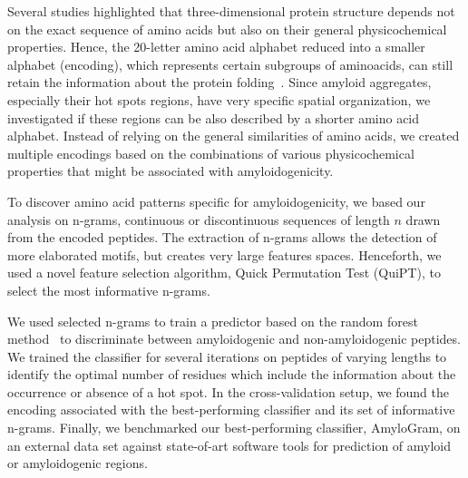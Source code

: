 \documentclass[fleqn,10pt,twoside]{gcb15submission}
\begin{document}
  Several studies highlighted that three-dimensional protein structure depends 
not on the exact sequence of amino acids but also on their general physicochemical 
properties. Hence, the 20-letter amino acid alphabet reduced into a smaller 
alphabet (encoding), which represents certain subgroups of aminoacids, 
can still retain the information about the protein folding~\citep{murphy_simplified_2000}. 
Since amyloid aggregates, especially 
their hot spots regions, have very specific spatial organization, we 
investigated if these regions can be also described by a shorter amino acid 
alphabet. Instead of relying on the general similarities of amino acids, we 
%
%
%
%
%
created multiple encodings based on the combinations of various physicochemical 
properties that might be associated with amyloidogenicity.  

  To discover amino acid patterns specific for amyloidogenicity, we based our 
analysis on n-grams, continuous or discontinuous sequences of length $n$ drawn 
from the encoded peptides. The extraction of n-grams allows the detection of 
more elaborated motifs, but creates very large features spaces. Henceforth, we 
used a novel feature selection algorithm, Quick Permutation Test (QuiPT), to 
select the most informative n-grams.

  We used selected n-grams to train a predictor based on the random 
forest method~\citep{breiman_random_2001} to discriminate between amyloidogenic and 
non-amyloidogenic peptides. We trained the classifier for several iterations on 
peptides of varying lengths to identify the optimal number of residues which 
include the information about the occurrence or absence of a hot spot. In the 
cross-validation setup, we found the encoding associated with the best-performing 
classifier and its set of informative n-grams. Finally, we benchmarked our 
best-performing classifier, AmyloGram, on an external data set against 
state-of-art software tools for prediction of amyloid or amyloidogenic regions.
\end{document}
